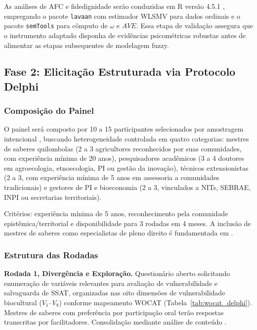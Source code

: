 As análises de AFC e fidedignidade serão conduzidas em R versão 4.5.1 \cite{RCore2024}, empregando o pacote \texttt{lavaan} com estimador WLSMV para dados ordinais \cite{Sellbom2019FactorRecommendations} e o pacote \texttt{semTools} para cômputo de $\omega$ e $AVE$. Essa etapa de validação assegura que o instrumento adaptado disponha de evidências psicométricas robustas antes de alimentar as etapas subsequentes de modelagem fuzzy.

\subsection{Fase 2: Elicitação Estruturada via Protocolo Delphi}

\subsubsection{Composição do Painel}

O painel será composto por 10 a 15 participantes selecionados por amostragem intencional \cite{Patton2015}, buscando heterogeneidade controlada em quatro categorias: mestres de saberes quilombolas (2 a 3 agricultores reconhecidos por suas comunidades, com experiência mínima de 20 anos), pesquisadores acadêmicos (3 a 4 doutores em agroecologia, etnoecologia, PI ou gestão da inovação), técnicos extensionistas (2 a 3, com experiência mínima de 5 anos em assessoria a comunidades tradicionais) e gestores de PI e bioeconomia (2 a 3, vinculados a NITs, SEBRAE, INPI ou secretarias territoriais).

Critérios: experiência mínima de 5 anos, reconhecimento pela comunidade epistêmica/territorial e disponibilidade para 3 rodadas em 4 meses. A inclusão de mestres de saberes como especialistas de pleno direito é fundamentada em \cite{Santos2007,Beaton2000}.

\subsubsection{Estrutura das Rodadas}

\textbf{Rodada 1, Divergência e Exploração.} Questionário aberto solicitando enumeração de variáveis relevantes para avaliação de vulnerabilidade e salvaguarda de SSAT, organizadas nas oito dimensões de vulnerabilidade biocultural ($V_1$--$V_8$) conforme mapeamento WOCAT (Tabela~\ref{tab:wocat_delphi}). Mestres de saberes com preferência por participação oral terão respostas transcritas por facilitadores. Consolidação mediante análise de conteúdo \cite{Braun2006}.

